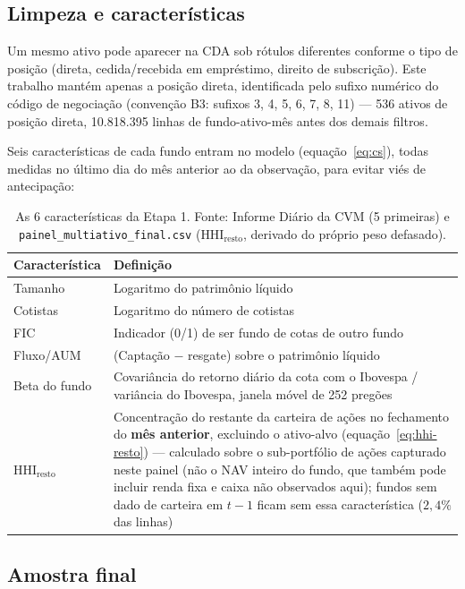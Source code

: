 \documentclass[11pt,a4paper]{article}
\begin{document}
\FloatBarrier
\subsection{Limpeza e características}

Um mesmo ativo pode aparecer na CDA sob rótulos diferentes conforme o tipo de posição (direta,
cedida/recebida em empréstimo, direito de subscrição). Este trabalho mantém apenas a posição
direta, identificada pelo sufixo numérico do código de negociação (convenção B3: sufixos 3, 4,
5, 6, 7, 8, 11) --- 536 ativos de posição direta, 10.818.395 linhas de fundo-ativo-mês antes dos
demais filtros.

Seis características de cada fundo entram no modelo (equação~\eqref{eq:cs}), todas medidas no
último dia do mês anterior ao da observação, para evitar viés de antecipação:

\begin{table}[h]\centering\small
\caption{As 6 características da Etapa 1. Fonte: Informe Diário da CVM (5 primeiras) e
\texttt{painel\_multiativo\_final.csv} ($\text{HHI}_{\text{resto}}$, derivado do próprio peso
defasado).}
\label{tab:caracteristicas}
\begin{tabular}{@{}p{2.6cm}p{9.5cm}@{}}
\toprule
Característica & Definição \\
\midrule
Tamanho & Logaritmo do patrimônio líquido \\
Cotistas & Logaritmo do número de cotistas \\
FIC & Indicador (0/1) de ser fundo de cotas de outro fundo \\
Fluxo/AUM & (Captação $-$ resgate) sobre o patrimônio líquido \\
Beta do fundo & Covariância do retorno diário da cota com o Ibovespa / variância do Ibovespa,
janela móvel de 252 pregões \\
$\text{HHI}_{\text{resto}}$ & Concentração do restante da carteira de ações no fechamento do
\textbf{mês anterior}, excluindo o ativo-alvo (equação~\eqref{eq:hhi-resto}) --- calculado
sobre o sub-portfólio de ações capturado neste painel (não o NAV inteiro do fundo, que também
pode incluir renda fixa e caixa não observados aqui); fundos sem dado de carteira em $t-1$
ficam sem essa característica ($2{,}4\%$ das linhas) \\
\bottomrule
\end{tabular}
\end{table}

\FloatBarrier
\subsection{Amostra final}
\end{document}

